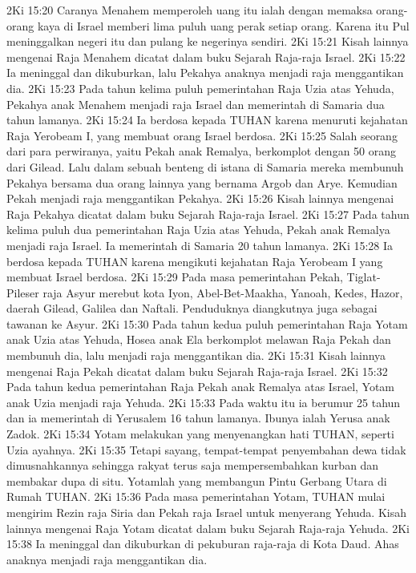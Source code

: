 2Ki 15:20  Caranya Menahem memperoleh uang itu ialah dengan memaksa orang-orang kaya di Israel memberi lima puluh uang perak setiap orang. Karena itu Pul meninggalkan negeri itu dan pulang ke negerinya sendiri.
2Ki 15:21  Kisah lainnya mengenai Raja Menahem dicatat dalam buku Sejarah Raja-raja Israel.
2Ki 15:22  Ia meninggal dan dikuburkan, lalu Pekahya anaknya menjadi raja menggantikan dia.
2Ki 15:23  Pada tahun kelima puluh pemerintahan Raja Uzia atas Yehuda, Pekahya anak Menahem menjadi raja Israel dan memerintah di Samaria dua tahun lamanya.
2Ki 15:24  Ia berdosa kepada TUHAN karena menuruti kejahatan Raja Yerobeam I, yang membuat orang Israel berdosa.
2Ki 15:25  Salah seorang dari para perwiranya, yaitu Pekah anak Remalya, berkomplot dengan 50 orang dari Gilead. Lalu dalam sebuah benteng di istana di Samaria mereka membunuh Pekahya bersama dua orang lainnya yang bernama Argob dan Arye. Kemudian Pekah menjadi raja menggantikan Pekahya.
2Ki 15:26  Kisah lainnya mengenai Raja Pekahya dicatat dalam buku Sejarah Raja-raja Israel.
2Ki 15:27  Pada tahun kelima puluh dua pemerintahan Raja Uzia atas Yehuda, Pekah anak Remalya menjadi raja Israel. Ia memerintah di Samaria 20 tahun lamanya.
2Ki 15:28  Ia berdosa kepada TUHAN karena mengikuti kejahatan Raja Yerobeam I yang membuat Israel berdosa.
2Ki 15:29  Pada masa pemerintahan Pekah, Tiglat-Pileser raja Asyur merebut kota Iyon, Abel-Bet-Maakha, Yanoah, Kedes, Hazor, daerah Gilead, Galilea dan Naftali. Penduduknya diangkutnya juga sebagai tawanan ke Asyur.
2Ki 15:30  Pada tahun kedua puluh pemerintahan Raja Yotam anak Uzia atas Yehuda, Hosea anak Ela berkomplot melawan Raja Pekah dan membunuh dia, lalu menjadi raja menggantikan dia.
2Ki 15:31  Kisah lainnya mengenai Raja Pekah dicatat dalam buku Sejarah Raja-raja Israel.
2Ki 15:32  Pada tahun kedua pemerintahan Raja Pekah anak Remalya atas Israel, Yotam anak Uzia menjadi raja Yehuda.
2Ki 15:33  Pada waktu itu ia berumur 25 tahun dan ia memerintah di Yerusalem 16 tahun lamanya. Ibunya ialah Yerusa anak Zadok.
2Ki 15:34  Yotam melakukan yang menyenangkan hati TUHAN, seperti Uzia ayahnya.
2Ki 15:35  Tetapi sayang, tempat-tempat penyembahan dewa tidak dimusnahkannya sehingga rakyat terus saja mempersembahkan kurban dan membakar dupa di situ. Yotamlah yang membangun Pintu Gerbang Utara di Rumah TUHAN.
2Ki 15:36  Pada masa pemerintahan Yotam, TUHAN mulai mengirim Rezin raja Siria dan Pekah raja Israel untuk menyerang Yehuda. Kisah lainnya mengenai Raja Yotam dicatat dalam buku Sejarah Raja-raja Yehuda.
2Ki 15:38  Ia meninggal dan dikuburkan di pekuburan raja-raja di Kota Daud. Ahas anaknya menjadi raja menggantikan dia.
